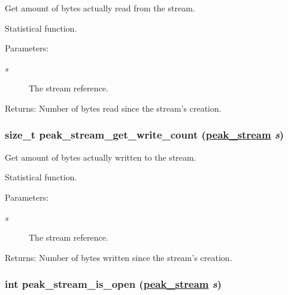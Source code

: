 Get amount of bytes actually read from the stream. 

Statistical function.

\begin{Desc}
\item[Parameters:]
\begin{description}
\item[{\em s}]The stream reference.\end{description}
\end{Desc}
\begin{Desc}
\item[Returns:]Number of bytes read since the stream's creation. \end{Desc}
\hypertarget{group__stream__common_ga12}{
\subsubsection[peak\_\-stream\_\-get\_\-write\_\-count]{\setlength{\rightskip}{0pt plus 5cm}size\_\-t peak\_\-stream\_\-get\_\-write\_\-count (\hyperlink{group__stream_ga0}{peak\_\-stream} {\em s})}}
\label{group__stream__common_ga12}


Get amount of bytes actually written to the stream. 

Statistical function.

\begin{Desc}
\item[Parameters:]
\begin{description}
\item[{\em s}]The stream reference.\end{description}
\end{Desc}
\begin{Desc}
\item[Returns:]Number of bytes written since the stream's creation. \end{Desc}
\hypertarget{group__stream__common_ga3}{
\subsubsection[peak\_\-stream\_\-is\_\-open]{\setlength{\rightskip}{0pt plus 5cm}int peak\_\-stream\_\-is\_\-open (\hyperlink{group__stream_ga0}{peak\_\-stream} {\em s})}}
\label{group__stream__common_ga3}


